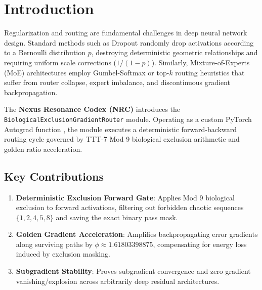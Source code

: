\section{Introduction}

Regularization and routing are fundamental challenges in deep neural network design. Standard methods such as Dropout \cite{srivastava2014dropout} randomly drop activations according to a Bernoulli distribution $p$, destroying deterministic geometric relationships and requiring uniform scale corrections ($1/(1-p)$). Similarly, Mixture-of-Experts (MoE) architectures \cite{shazeer2017outrageously} employ Gumbel-Softmax or top-$k$ routing heuristics that suffer from router collapse, expert imbalance, and discontinuous gradient backpropagation.

The \textbf{Nexus Resonance Codex (NRC)} introduces the \texttt{BiologicalExclusionGradientRouter} module. Operating as a custom PyTorch Autograd function \cite{paszke2019pytorch}, the module executes a deterministic forward-backward routing cycle governed by TTT-7 Mod 9 biological exclusion arithmetic and golden ratio acceleration.

\subsection{Key Contributions}
\begin{enumerate}[label=\textbf{\arabic*.}]
    \item \textbf{Deterministic Exclusion Forward Gate}: Applies Mod 9 biological exclusion to forward activations, filtering out forbidden chaotic sequences $\{1, 2, 4, 5, 8\}$ and saving the exact binary pass mask.
    \item \textbf{Golden Gradient Acceleration}: Amplifies backpropagating error gradients along surviving paths by $\phi \approx 1.61803398875$, compensating for energy loss induced by exclusion masking.
    \item \textbf{Subgradient Stability}: Proves subgradient convergence and zero gradient vanishing/explosion across arbitrarily deep residual architectures.
\end{enumerate}
